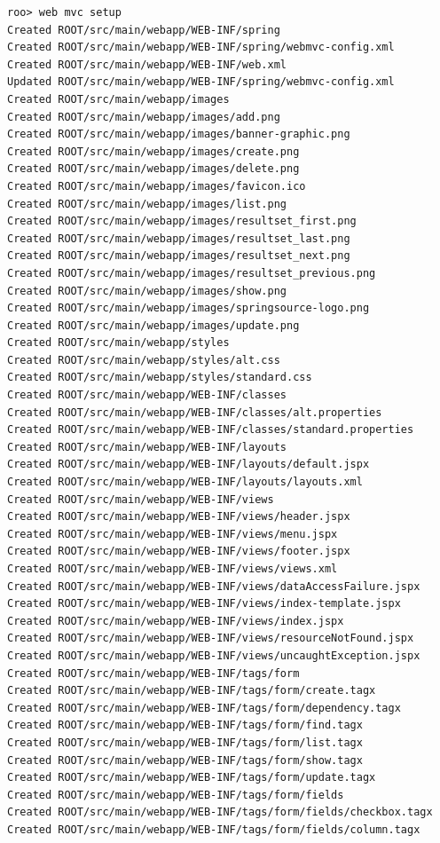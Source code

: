 \documentclass[12pt]{article}
\begin{document}
\begin{enumerate}
\begin{lstlisting}[frame=single] 
roo> web mvc setup
Created ROOT/src/main/webapp/WEB-INF/spring
Created ROOT/src/main/webapp/WEB-INF/spring/webmvc-config.xml
Created ROOT/src/main/webapp/WEB-INF/web.xml
Updated ROOT/src/main/webapp/WEB-INF/spring/webmvc-config.xml
Created ROOT/src/main/webapp/images
Created ROOT/src/main/webapp/images/add.png
Created ROOT/src/main/webapp/images/banner-graphic.png
Created ROOT/src/main/webapp/images/create.png
Created ROOT/src/main/webapp/images/delete.png
Created ROOT/src/main/webapp/images/favicon.ico
Created ROOT/src/main/webapp/images/list.png
Created ROOT/src/main/webapp/images/resultset_first.png
Created ROOT/src/main/webapp/images/resultset_last.png
Created ROOT/src/main/webapp/images/resultset_next.png
Created ROOT/src/main/webapp/images/resultset_previous.png
Created ROOT/src/main/webapp/images/show.png
Created ROOT/src/main/webapp/images/springsource-logo.png
Created ROOT/src/main/webapp/images/update.png
Created ROOT/src/main/webapp/styles
Created ROOT/src/main/webapp/styles/alt.css
Created ROOT/src/main/webapp/styles/standard.css
Created ROOT/src/main/webapp/WEB-INF/classes
Created ROOT/src/main/webapp/WEB-INF/classes/alt.properties
Created ROOT/src/main/webapp/WEB-INF/classes/standard.properties
Created ROOT/src/main/webapp/WEB-INF/layouts
Created ROOT/src/main/webapp/WEB-INF/layouts/default.jspx
Created ROOT/src/main/webapp/WEB-INF/layouts/layouts.xml
Created ROOT/src/main/webapp/WEB-INF/views
Created ROOT/src/main/webapp/WEB-INF/views/header.jspx
Created ROOT/src/main/webapp/WEB-INF/views/menu.jspx
Created ROOT/src/main/webapp/WEB-INF/views/footer.jspx
Created ROOT/src/main/webapp/WEB-INF/views/views.xml
Created ROOT/src/main/webapp/WEB-INF/views/dataAccessFailure.jspx
Created ROOT/src/main/webapp/WEB-INF/views/index-template.jspx
Created ROOT/src/main/webapp/WEB-INF/views/index.jspx
Created ROOT/src/main/webapp/WEB-INF/views/resourceNotFound.jspx
Created ROOT/src/main/webapp/WEB-INF/views/uncaughtException.jspx
Created ROOT/src/main/webapp/WEB-INF/tags/form
Created ROOT/src/main/webapp/WEB-INF/tags/form/create.tagx
Created ROOT/src/main/webapp/WEB-INF/tags/form/dependency.tagx
Created ROOT/src/main/webapp/WEB-INF/tags/form/find.tagx
Created ROOT/src/main/webapp/WEB-INF/tags/form/list.tagx
Created ROOT/src/main/webapp/WEB-INF/tags/form/show.tagx
Created ROOT/src/main/webapp/WEB-INF/tags/form/update.tagx
Created ROOT/src/main/webapp/WEB-INF/tags/form/fields
Created ROOT/src/main/webapp/WEB-INF/tags/form/fields/checkbox.tagx
Created ROOT/src/main/webapp/WEB-INF/tags/form/fields/column.tagx

\end{lstlisting}
\end{enumerate}
\end{document}
